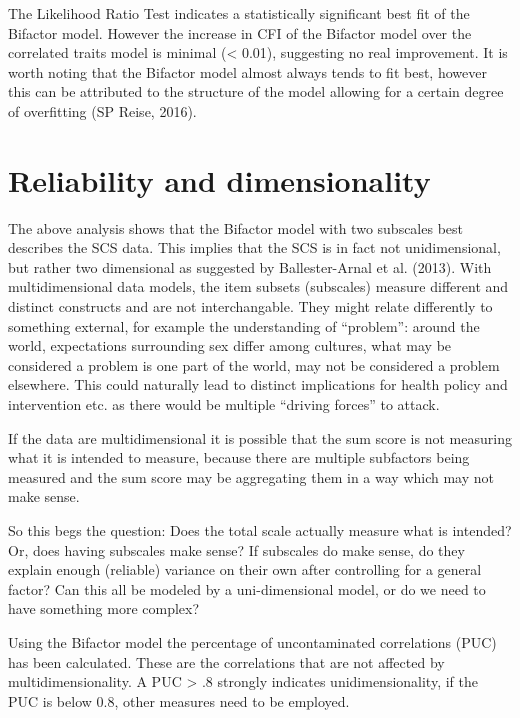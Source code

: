 \documentclass[
  man,floatsintext]{apa6}
\begin{document}
The Likelihood Ratio Test indicates a statistically significant best fit of the Bifactor model. However the increase in CFI of the Bifactor model over the correlated traits model is minimal (\textless{} 0.01), suggesting no real improvement. It is worth noting that the Bifactor model almost always tends to fit best, however this can be attributed to the structure of the model allowing for a certain degree of overfitting (SP Reise, 2016).

\hypertarget{reliability-and-dimensionality}{%
\section{Reliability and dimensionality}\label{reliability-and-dimensionality}}

The above analysis shows that the Bifactor model with two subscales best describes the SCS data. This implies that the SCS is in fact not unidimensional, but rather two dimensional as suggested by Ballester-Arnal et al. (2013). With multidimensional data models, the item subsets (subscales) measure different and distinct constructs and are not interchangable. They might relate differently to something external, for example the understanding of ``problem'': around the world, expectations surrounding sex differ among cultures, what may be considered a problem is one part of the world, may not be considered a problem elsewhere. This could naturally lead to distinct implications for health policy and intervention etc. as there would be multiple ``driving forces'' to attack.

If the data are multidimensional it is possible that the sum score is not measuring what it is intended to measure, because there are multiple subfactors being measured and the sum score may be aggregating them in a way which may not make sense.

So this begs the question: Does the total scale actually measure what is intended? Or, does having subscales make sense? If subscales do make sense, do they explain enough (reliable) variance on their own after controlling for a general factor? Can this all be modeled by a uni-dimensional model, or do we need to have something more complex?

Using the Bifactor model the percentage of uncontaminated correlations (PUC) has been calculated. These are the correlations that are not affected by multidimensionality. A PUC \textgreater{} .8 strongly indicates unidimensionality, if the PUC is below 0.8, other measures need to be employed.
\end{document}
